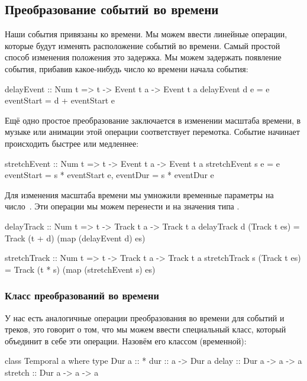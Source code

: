 \subsection{Преобразование событий во времени}

Наши события привязаны ко времени. Мы можем ввести
линейные операции, которые будут изменять расположение
событий во времени. Самый простой способ изменения
положения это задержка. Мы можем задержать появление
события, прибавив какое-нибудь число ко времени
начала события:

\begin{code}
delayEvent :: Num t => t -> Event t a -> Event t a
delayEvent d e = e{ eventStart = d + eventStart e }
\end{code}

Ещё одно простое преобразование заключается в
изменении масштаба времени, в музыке или анимации этой
операции соответствует перемотка. Событие начинает
происходить быстрее или медленнее:


\begin{code}
stretchEvent :: Num t => t -> Event t a -> Event t a
stretchEvent s e = e{ 
    eventStart  = s * eventStart e, 
    eventDur    = s * eventDur   e }
\end{code}

Для изменения масштаба времени мы умножили временные
параметры на \mbox{число }. Эти операции мы можем
перенести и на значения типа . 

\begin{code}
delayTrack :: Num t => t -> Track t a -> Track t a
delayTrack d (Track t es) = Track (t + d) (map (delayEvent d) es) 

stretchTrack :: Num t => t -> Track t a -> Track t a
stretchTrack s (Track t es) = Track (t * s) (map (stretchEvent s) es) 
\end{code}

\subsubsection{Класс преобразований во времени}

У нас есть аналогичные операции преобразования во времени
для событий и треков, это говорит о том, что мы можем
ввести специальный класс, который объединит в себе эти
операции. Назовём его классом  (временн\emph{о}й):

\begin{code}
class Temporal a where
    type Dur a :: *
    dur     :: a -> Dur a
    delay   :: Dur a -> a -> a
    stretch :: Dur a -> a -> a
\end{code}

